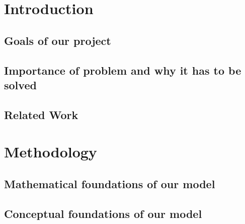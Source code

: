 \section{Introduction}

\subsection{Goals of our project}

\subsection{Importance of problem and why it has to be solved}

\subsection{Related Work}


\section{Methodology}

\subsection{Mathematical foundations of our model}

\subsection{Conceptual foundations of our model}
